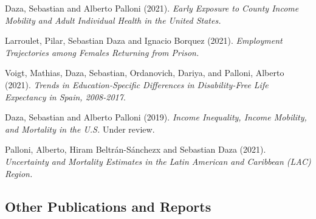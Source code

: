 \documentclass[10pt,letterpaper]{article}
\renewenvironment{itemize}{
  \begin{list}{}{
    \setlength{\leftmargin}{1.5em}
    \setlength{\itemsep}{0.25em}
    \setlength{\parskip}{0pt}
    \setlength{\parsep}{0.25em}
  }
}{
  \end{list}
}
\begin{document}
\begin{itemize}

\item Daza, Sebastian and Alberto Palloni (2021). {\textit{Early Exposure to County Income Mobility and Adult Individual Health in the United States.}}
\item Larroulet, Pilar, Sebastian Daza and Ignacio Borquez (2021). {\textit{Employment Trajectories among Females Returning from Prison.}}
\item Voigt, Mathias, Daza, Sebastian, Ordanovich, Dariya, and Palloni, Alberto (2021). {\textit{Trends in Education-Specific Differences in Disability-Free Life Expectancy in Spain, 2008-2017}}.
\item Daza, Sebastian and Alberto Palloni (2019). {\textit{Income Inequality, Income Mobility, and Mortality in the U.S.}} Under review.
\item Palloni, Alberto, Hiram Beltrán-Sánchezx and Sebastian Daza (2021). {\textit{Uncertainty and Mortality Estimates in the Latin American and Caribbean (LAC) Region.}}

\end{itemize}

\subsection*{Other Publications and Reports}
\end{document}
